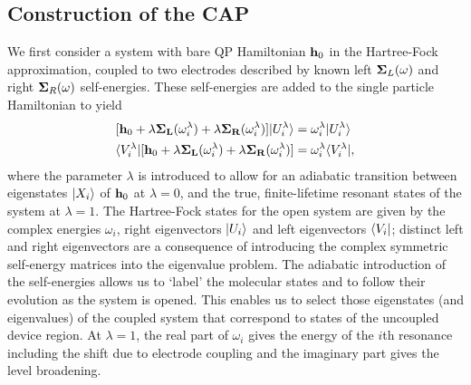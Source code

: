 \subsection{Construction of the \ac{CAP}}
We first consider a system with bare \ac{QP} Hamiltonian $\mathbf{h}_0$ in the
Hartree-Fock approximation, coupled to two electrodes described by known
left $\mathbf{\Sigma}_L(\omega)$ and right $\mathbf{\Sigma}_R(\omega)$ self-energies.
These self-energies are added to the single particle
Hamiltonian to yield
\numparts
\begin{eqnarray}
\label{eq:capseq}
        [\mathbf{h}_0 + \lambda \mathbf{\Sigma_L}(\omega_i^\lambda)
            +\lambda \mathbf{\Sigma_R}(\omega_i^\lambda)] |U_i^\lambda \rangle
        &= \omega_i^\lambda |U_i^\lambda \rangle \\
        \langle V_i^\lambda| [\mathbf{h}_0 + \lambda \mathbf{\Sigma_L}(\omega_i^\lambda)
            +\lambda \mathbf{\Sigma_R}(\omega_i^\lambda)]
        &= \omega_i^\lambda \langle V_i^\lambda|,
        \label{eq:adiabaticap}
\end{eqnarray}
\endnumparts
where the parameter $\lambda$ is introduced to allow for an adiabatic
transition between eigenstates $|X_i \rangle$ of $\mathbf{h}_0$ at $\lambda = 0$,
and the true, finite-lifetime resonant states of the system at
$\lambda = 1$. The Hartree-Fock states for the open system are given by
the complex energies $\omega_i$, right eigenvectors $|U_i \rangle$ and left
eigenvectors $\langle V_i|$; distinct left and right eigenvectors are a
consequence of introducing the complex symmetric self-energy matrices into
the eigenvalue problem.
The adiabatic introduction of the self-energies allows
us to `label' the molecular states and to follow their evolution as the
system is opened. This enables us to select those eigenstates (and
eigenvalues) of the coupled system that correspond to states of the
uncoupled device region. At $\lambda=1$, the real part of $\omega_i$
gives the energy of the $i$th resonance including the shift due to
electrode coupling and the imaginary part gives the level broadening.

